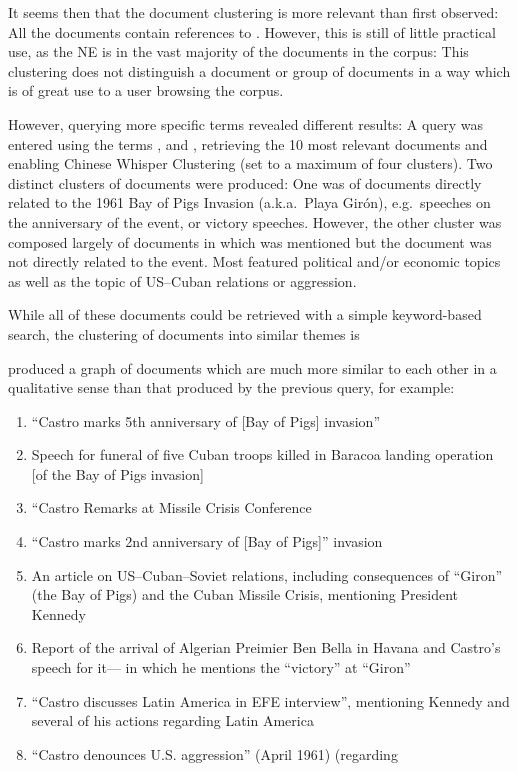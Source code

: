 It seems then that the document clustering is more relevant than first observed: All the documents contain references to . However, this is still of little practical use, as the NE  is in the vast majority of the documents in the corpus: This clustering does not distinguish a document or group of documents in a way which is of great use to a user browsing the corpus.

However, querying more specific terms revealed different results: A query was entered using the terms , and , retrieving the 10 most relevant documents and enabling Chinese Whisper Clustering (set to a maximum of four clusters). Two distinct clusters of documents were produced: One was of documents directly related to the 1961 Bay of Pigs Invasion (a.k.a.\ Playa Gir\'{o}n), e.g.\ speeches on the anniversary of the event, or victory speeches. However, the other cluster was composed largely of documents in which  was mentioned but the document was not directly related to the event. Most featured political and/or economic topics as well as the topic of US--Cuban relations or aggression.

While all of these documents could be retrieved with a simple keyword-based search, the clustering of documents into similar themes is 


produced a graph of documents which are much more similar to each other in a qualitative sense than that produced by the previous query, for example:

\begin{enumerate}
\item ``Castro marks 5th anniversary of [Bay of Pigs] invasion'' \label{eval:doc274}
\item Speech for funeral of five Cuban troops killed in Baracoa landing operation [of the Bay of Pigs invasion]\label{eval:doc337}
\item ``Castro Remarks at Missile Crisis Conference\label{eval:doc1418}
\item ``Castro marks 2nd anniversary of [Bay of Pigs]'' invasion \label{eval:doc210}
\item An article on US--Cuban--Soviet relations, including consequences of ``Giron'' (the Bay of Pigs) and the Cuban Missile Crisis, mentioning President Kennedy\label{eval:doc864}
\item Report of the arrival of Algerian Preimier Ben Bella in Havana and Castro's speech for it--- in which he mentions the ``victory'' at ``Giron''
\item ``Castro discusses Latin America in EFE interview'', mentioning Kennedy and several of his actions regarding Latin America \label{eval:doc923}
\item ``Castro denounces U.S. aggression'' (April 1961) \label{eval:doc134} (regarding 
\end{enumerate} 

